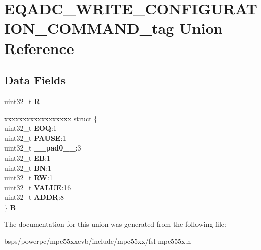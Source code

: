 \hypertarget{unionEQADC__WRITE__CONFIGURATION__COMMAND__tag}{}\section{E\+Q\+A\+D\+C\+\_\+\+W\+R\+I\+T\+E\+\_\+\+C\+O\+N\+F\+I\+G\+U\+R\+A\+T\+I\+O\+N\+\_\+\+C\+O\+M\+M\+A\+N\+D\+\_\+tag Union Reference}
\label{unionEQADC__WRITE__CONFIGURATION__COMMAND__tag}
\subsection*{Data Fields}
\begin{DoxyCompactItemize}
\item 
\mbox{\label{unionEQADC__WRITE__CONFIGURATION__COMMAND__tag_a3f09c5febd616634582557c0b6a37174}} 
uint32\+\_\+t {\bfseries R}
\item 
\mbox{\label{unionEQADC__WRITE__CONFIGURATION__COMMAND__tag_abb6173400c90dd8aed7319770da59be9}} 
\begin{tabbing}
xx\=xx\=xx\=xx\=xx\=xx\=xx\=xx\=xx\=\kill
struct \{\\
\>uint32\_t {\bfseries EOQ}:1\\
\>uint32\_t {\bfseries PAUSE}:1\\
\>uint32\_t {\bfseries \_\_pad0\_\_}:3\\
\>uint32\_t {\bfseries EB}:1\\
\>uint32\_t {\bfseries BN}:1\\
\>uint32\_t {\bfseries RW}:1\\
\>uint32\_t {\bfseries VALUE}:16\\
\>uint32\_t {\bfseries ADDR}:8\\
\} {\bfseries B}\\

\end{tabbing}\end{DoxyCompactItemize}


The documentation for this union was generated from the following file\+:\begin{DoxyCompactItemize}
\item 
bsps/powerpc/mpc55xxevb/include/mpc55xx/fsl-\/mpc555x.\+h\end{DoxyCompactItemize}
